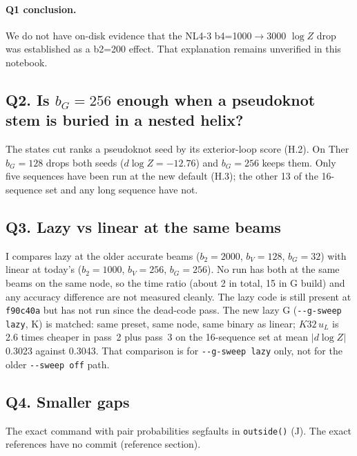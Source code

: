 \documentclass[11pt]{article}
\begin{document}
\paragraph{Q1 conclusion.}
We do not have on-disk evidence that the NL4-3 b4=1000${\to}$3000 $\log Z$ drop was established as a b2=200 effect. That explanation remains unverified in this notebook.

\subsection{Q2. Is $b_G=256$ enough when a pseudoknot stem is buried in a nested helix?}
The states cut ranks a pseudoknot seed by its exterior-loop score (H.2). On Ther $b_G=128$ drops both seeds ($d\log Z=-12.76$) and $b_G=256$ keeps them. Only five sequences have been run at the new default (H.3); the other 13 of the 16-sequence set and any long sequence have not.

\subsection{Q3. Lazy vs linear at the same beams}
I compares lazy at the older accurate beams ($b_2=2000$, $b_V=128$, $b_G=32$) with linear at today's ($b_2=1000$, $b_V=256$, $b_G=256$). No run has both at the same beams on the same node, so the time ratio (about 2 in total, 15 in G build) and any accuracy difference are not measured cleanly. The lazy code is still present at \texttt{f90c40a} but has not run since the dead-code pass. The new lazy G (\texttt{-{}-g-sweep lazy}, K) is matched: same preset, same node, same binary as linear; $K32\,u_L$ is 2.6 times cheaper in pass~2 plus pass~3 on the 16-sequence set at mean $|d\log Z|$ 0.3023 against 0.3043. That comparison is for \texttt{-{}-g-sweep lazy} only, not for the older \texttt{-{}-sweep off} path.

\subsection{Q4. Smaller gaps}
The exact command with pair probabilities segfaults in \texttt{outside()} (J). The exact references have no commit (reference section).
\end{document}
